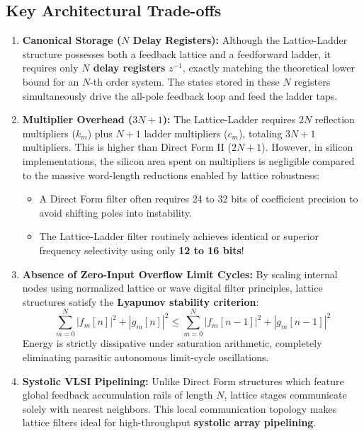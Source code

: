 \documentclass[11pt,a4paper]{article}
\begin{document}
\subsection{Key Architectural Trade-offs}
\begin{enumerate}
    \item \textbf{Canonical Storage ($N$ Delay Registers):} Although the Lattice-Ladder structure possesses both a feedback lattice and a feedforward ladder, it requires only \textbf{$N$ delay registers} $z^{-1}$, exactly matching the theoretical lower bound for an $N$-th order system. The states stored in these $N$ registers simultaneously drive the all-pole feedback loop and feed the ladder taps.
    \item \textbf{Multiplier Overhead ($3N + 1$):} The Lattice-Ladder requires $2N$ reflection multipliers ($k_m$) plus $N + 1$ ladder multipliers ($c_m$), totaling $3N + 1$ multipliers. This is higher than Direct Form II ($2N + 1$). However, in silicon implementations, the silicon area spent on multipliers is negligible compared to the massive word-length reductions enabled by lattice robustness:
    \begin{itemize}
        \item A Direct Form filter often requires 24 to 32 bits of coefficient precision to avoid shifting poles into instability.
        \item The Lattice-Ladder filter routinely achieves identical or superior frequency selectivity using only \textbf{12 to 16 bits}!
    \end{itemize}
    \item \textbf{Absence of Zero-Input Overflow Limit Cycles:} By scaling internal nodes using normalized lattice or wave digital filter principles, lattice structures satisfy the \textbf{Lyapunov stability criterion}:
    \begin{equation}
    \sum_{m=0}^N |f_m[n]|^2 + |g_m[n]|^2 \le \sum_{m=0}^N |f_m[n-1]|^2 + |g_m[n-1]|^2
    \end{equation}
    Energy is strictly dissipative under saturation arithmetic, completely eliminating parasitic autonomous limit-cycle oscillations.
    \item \textbf{Systolic VLSI Pipelining:} Unlike Direct Form structures which feature global feedback accumulation rails of length $N$, lattice stages communicate solely with nearest neighbors. This local communication topology makes lattice filters ideal for high-throughput \textbf{systolic array pipelining}.
\end{enumerate}
\end{document}
